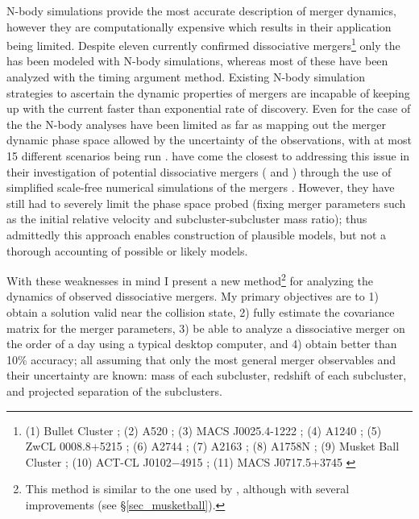 \documentclass[12pt]{emulateapj}
\begin{document}
N-body simulations provide the most accurate description of merger dynamics, however they are computationally expensive which results in their application being limited.
Despite eleven currently confirmed dissociative mergers\footnote{(1) Bullet Cluster \citep{Clowe:2004eq}; 
(2) A520 \citep{Mahdavi:2007ed}; 
(3) MACS J0025.4-1222 \citep{Bradac:2008gw}; 
(4) A1240 \citep{Barrena:2009to}; 
(5) ZwCL 0008.8+5215 \citep{vanWeeren:2011ko}; 
(6) A2744 \citep{Merten:2011gu}; 
(7) A2163 \citep{Okabe:2011gv}; 
(8) A1758N \citep{Ragozzine:2011jj}; 
(9) Musket Ball Cluster \citep{Dawson:2012dl}; 
(10) ACT-CL J0102−4915 \citep{Menanteau:2012bf}; 
(11) MACS J0717.5+3745 \citep{Mroczkowski:2012vs}} only the  has been modeled with N-body simulations, whereas most of these have been analyzed with the timing argument method.
Existing N-body simulation strategies to ascertain the dynamic properties of mergers are incapable of keeping up with the current faster than exponential rate of discovery.
Even for the case of the  the N-body analyses have been limited as far as mapping out the merger dynamic phase space allowed by  the uncertainty of the observations, with at most 15 different scenarios being run \citep{Mastropietro:2008fs}.
\citet{Gomez:2012ex} have come the closest to addressing this issue in their investigation of potential dissociative mergers ( and ) through the use of simplified scale-free numerical simulations of the mergers \citep[see][for details]{Gomez:2000kj}.  
However, they have still had to severely limit the phase space probed (fixing merger parameters such as the initial relative velocity and subcluster-subcluster mass ratio); thus admittedly this approach enables construction of plausible models, but not a thorough accounting of possible or likely models.


With these weaknesses in mind I present a new method\footnote{This method is similar to the one used by \citet{Dawson:2012dl}, although with several improvements (see \S\ref{sec_musketball}).}  for analyzing the dynamics of observed dissociative mergers.
My primary objectives are to 1) obtain a solution valid near the collision state, 2) fully estimate the covariance matrix for the merger parameters, 3) be able to analyze a dissociative merger on the order of a day using a typical desktop computer, and 4) obtain better than 10\% accuracy; all assuming that only the most general merger observables and their uncertainty are known: mass of each subcluster, redshift of each subcluster, and projected separation of the subclusters.
\end{document}
